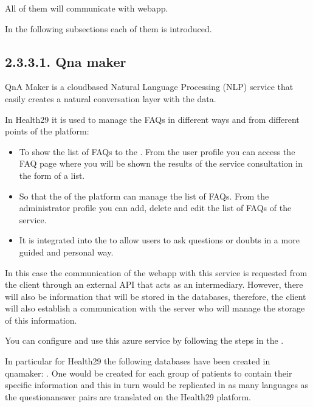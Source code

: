 \documentclass[letterpaper,10pt,english]{sphinxmanual}
\begin{document}
All of them will communicate with webapp.

In the following subsections each of them is introduced.


\subsection{2.3.3.1. Qna maker}
\label{\detokenize{pages/SW/Components:qna-maker}}
QnA Maker is a cloud\sphinxhyphen{}based Natural Language Processing (NLP) service that easily creates a natural conversation layer with the data.

In Health29 it is used to manage the FAQs in different ways and from different points of the platform:
\begin{itemize}
\item {} 
To show the list of FAQs to the . From the user profile you can access the FAQ page where you will be shown the results of the service consultation in the form of a list.

\item {} 
So that the  of the platform can manage the list of FAQs. From the administrator profile you can add, delete and edit the list of FAQs of the service.

\item {} 
It is integrated into the  to allow users to ask questions or doubts in a more guided and personal way.

\end{itemize}

In this case the communication of the webapp with this service is requested from the client through an external API that acts as an intermediary. However, there will also be information that will be stored in the databases, therefore, the client will also establish a communication with the server who will manage the storage of this information.

You can configure and use this azure service by following the steps in the .

In particular for Health29 the following databases have been created in qnamaker: . One would be created for each group of patients to contain their specific information and this in turn would be replicated in as many languages as the question\sphinxhyphen{}answer pairs are translated on the Health29 platform.
\end{document}
